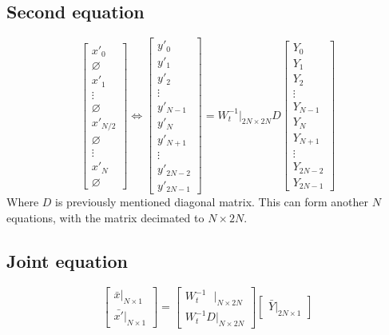 \documentclass[12pt]{article}
\begin{document}
\subsection{Second equation}
\begin{equation}
    \begin{bmatrix}
        x'_0 \\ \varnothing \\ x'_1 \\ \vdots \\ \varnothing \\ x'_{N/2} \\ \varnothing \\ \vdots \\ x'_N \\ \varnothing
    \end{bmatrix}
\Leftrightarrow
    \begin{bmatrix}
        y'_0 \\ y'_1 \\ y'_2 \\ \vdots \\ y'_{N-1} \\ y'_N \\ y'_{N+1} \\ \vdots \\ y'_{2N-2} \\ y'_{2N-1}
    \end{bmatrix}
= W_t^{-1}|_{2N\times 2N} D
    \begin{bmatrix}
        Y_0 \\ Y_1 \\ Y_2 \\ \vdots \\ Y_{N-1} \\Y_N \\ Y_{N+1} \\ \vdots \\ Y_{2N-2} \\ Y_{2N-1} 
    \end{bmatrix}
\end{equation}
Where $D$ is previously mentioned diagonal matrix. 
This can form another $N$ equations, with the matrix decimated to $N\times 2N$.

\subsection{Joint equation}
\begin{equation}
    \begin{bmatrix}
        \bar{x} |_{N\times 1} \\
        \bar{x'}|_{N\times 1}
    \end{bmatrix}
    =
    \begin{bmatrix}
        W_t^{-1}~~~|_{N\times 2N} \\
        W_t^{-1} D|_{N\times 2N}  
    \end{bmatrix}
    \begin{bmatrix}
        \bar{Y}|_{2N\times 1}
    \end{bmatrix}
\end{equation}
\end{document}
